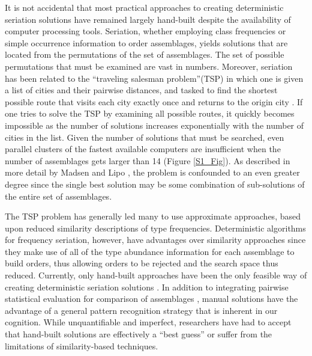 \documentclass[10pt,letterpaper]{article}
\begin{document}
It is not accidental that most practical approaches to creating deterministic seriation solutions have remained largely hand-built despite the availability of computer processing tools. Seriation, whether employing class frequencies or simple occurrence information to order assemblages, yields solutions that are located from the permutations of the set of assemblages. The set of possible permutations that must be examined are vast in numbers. Moreover, seriation has been related to the ``traveling salesman problem''(TSP) in which one is given a list of cities and their pairwise distances, and tasked to find the shortest possible route that visits each city exactly once and returns to the origin city \cite{Kadane1971,Laporte1978,Wilkinson1971}. If one tries to solve the TSP by examining all possible routes, it quickly becomes impossible as the number of solutions increases exponentially with the number of cities in the list. Given the number of solutions that must be searched, even parallel clusters of the fastest available computers are insufficient when the number of assemblages gets larger than 14 (Figure \ref{S1_Fig}). As described in more detail by Madsen and Lipo \cite{Madsen2014}, the problem is confounded to an even greater degree since the single best solution may be some combination of sub-solutions of the entire set of assemblages. 





The TSP problem has generally led many to use approximate approaches, based upon reduced similarity descriptions of type frequencies. Deterministic algorithms for frequency seriation, however, have advantages over similarity approaches since they make use of all of the type abundance information for each assemblage to build orders, thus allowing orders to be rejected and the search space thus reduced. Currently, only hand-built approaches have been the only feasible way of creating deterministic seriation solutions \cite{Lipo1997Population,Lipo2001,Lipo2008}. In addition to integrating pairwise statistical evaluation for comparison of assemblages \cite{Lipo1997Population}, manual solutions have the advantage of a general pattern recognition strategy that is inherent in our cognition. While unquantifiable and imperfect, researchers have had to accept that hand-built solutions are effectively a ``best guess'' or suffer from the limitations of similarity-based techniques. 
\end{document}
